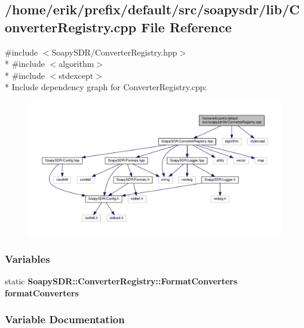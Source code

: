 \subsection{/home/erik/prefix/default/src/soapysdr/lib/\+Converter\+Registry.cpp File Reference}
\label{ConverterRegistry_8cpp}
{\ttfamily \#include $<$Soapy\+S\+D\+R/\+Converter\+Registry.\+hpp$>$}\\*
{\ttfamily \#include $<$algorithm$>$}\\*
{\ttfamily \#include $<$stdexcept$>$}\\*
Include dependency graph for Converter\+Registry.\+cpp\+:
\nopagebreak
\begin{figure}[H]
\begin{center}
\leavevmode
\includegraphics[width=350pt]{d6/dbb/ConverterRegistry_8cpp__incl}
\end{center}
\end{figure}
\subsubsection*{Variables}
\begin{DoxyCompactItemize}
\item 
static {\bf Soapy\+S\+D\+R\+::\+Converter\+Registry\+::\+Format\+Converters} {\bf format\+Converters}
\end{DoxyCompactItemize}


\subsubsection{Variable Documentation}
